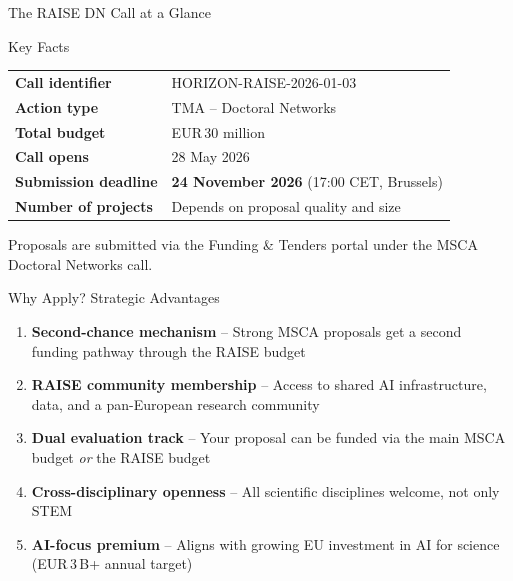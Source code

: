 \documentclass[aspectratio=169]{beamer}
\newcommand{\eur}[1]{EUR\,#1}
\newcommand{\highlight}[1]{\textcolor{euBlue}{\textbf{#1}}}
\begin{document}
\begin{frame}{The RAISE DN Call at a Glance}
\begin{block}{Key Facts}
\renewcommand{\arraystretch}{1.35}
\begin{tabular}{@{}l l@{}}
  \textbf{Call identifier}   & HORIZON-RAISE-2026-01-03 \\
  \textbf{Action type}       & TMA -- Doctoral Networks \\
  \textbf{Total budget}      & \eur{30 million} \\
  \textbf{Call opens}        & 28 May 2026 \\
  \textbf{Submission deadline} & \textbf{24 November 2026} (17:00 CET, Brussels) \\
  \textbf{Number of projects}  & Depends on proposal quality and size \\
\end{tabular}
\end{block}
\vspace{6pt}
\textcolor{euBlue}{\small Proposals are submitted via the Funding \& Tenders portal under the MSCA Doctoral Networks call.}
\end{frame}

\begin{frame}{Why Apply?  Strategic Advantages}
\begin{enumerate}
  \item \highlight{Second-chance mechanism} -- Strong MSCA proposals get a second funding pathway through the RAISE budget
  \item \highlight{RAISE community membership} -- Access to shared AI infrastructure, data, and a pan-European research community
  \item \highlight{Dual evaluation track} -- Your proposal can be funded via the main MSCA budget \emph{or} the RAISE budget
  \item \highlight{Cross-disciplinary openness} -- All scientific disciplines welcome, not only STEM
  \item \highlight{AI-focus premium} -- Aligns with growing EU investment in AI for science (EUR\,3\,B+ annual target)
\end{enumerate}
\end{frame}
\end{document}
